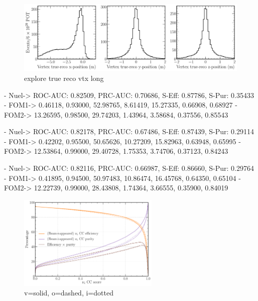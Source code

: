 \begin{figure} %
    \includegraphics[width=\textwidth]{diagrams/7-cvn/chipsnet/explore_true_reco_vtx.pdf}
    \caption[explore true reco vtx short]
    {explore true reco vtx long}
    \label{fig:explore_true_reco_vtx}
\end{figure}

- Nuel-> ROC-AUC: 0.82509, PRC-AUC: 0.70686, S-Eff: 0.87786, S-Pur: 0.35433
- FOM1-> 0.46118, 0.93000, 52.98765, 8.61419, 15.27335, 0.66908, 0.68927
- FOM2-> 13.26595, 0.98500, 29.74203, 1.43964, 3.58684, 0.37556, 0.85543

- Nuel-> ROC-AUC: 0.82178, PRC-AUC: 0.67486, S-Eff: 0.87439, S-Pur: 0.29114
- FOM1-> 0.42202, 0.95500, 50.65626, 10.27209, 15.82963, 0.63948, 0.65995
- FOM2-> 12.53864, 0.99000, 29.40728, 1.75353, 3.74706, 0.37123, 0.84243

- Nuel-> ROC-AUC: 0.82116, PRC-AUC: 0.66987, S-Eff: 0.86660, S-Pur: 0.29764
- FOM1-> 0.41895, 0.94500, 50.97483, 10.86474, 16.45768, 0.64350, 0.65104
- FOM2-> 12.22739, 0.99000, 28.43808, 1.74364, 3.66555, 0.35900, 0.84019

\begin{figure} %
    \includegraphics[width=0.6\textwidth]{diagrams/7-cvn/chipsnet/repr_nuel_eff_curves.pdf}
    \caption[repr nuel eff curves short]
    {v=solid, o=dashed, i=dotted}
    \label{fig:repr_nuel_eff_curves}
\end{figure}

